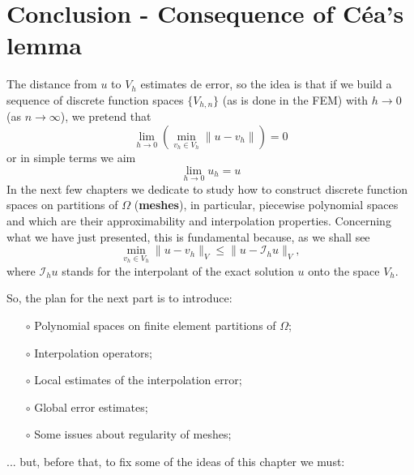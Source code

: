 \section{Conclusion - Consequence of C\'ea's lemma}

The distance from $u$ to $V_h$ estimates de error, so the
idea is that if we build a sequence of discrete function
spaces $\{V_{h,n}\}$ (as is done in the FEM)
with $h\rightarrow 0$ (as $n\rightarrow \infty$),
we pretend that
\begin{equation}
\lim_{h \rightarrow 0} \left ( \min_{v_h \in V_h} \lVert u - v_h \rVert \right ) = 0
\end{equation}
or in simple terms we aim
\begin{equation}
\lim_{h \rightarrow 0} u_h = u
\end{equation}
In the next few chapters we dedicate to study how to construct
discrete function spaces on partitions of $\Omega$ (\textbf{meshes}),
in particular, piecewise polynomial spaces and which are their
approximability and interpolation properties.
Concerning what we have just presented, this is fundamental
because, as we shall see
\begin{equation}
 \min_{v_h \in V_h} \lVert u-v_h \rVert_V \le \lVert u-\mathcal{I}_h{u} \rVert_V ,\nonumber 
\end{equation}
where $\mathcal{I}_h{u}$ stands for the interpolant of the exact
solution $u$ onto the space $V_h$.

So, the plan for the next part is to introduce:

\begin{itemize}
\item[$\circ$] Polynomial spaces on finite element partitions of $\Omega$;
\item[$\circ$] Interpolation operators;
\item[$\circ$] Local estimates of the interpolation error;
\item[$\circ$] Global error estimates;
\item[$\circ$] Some issues about regularity of meshes;
\end{itemize}

\bigskip

... but, before that, to fix some of the ideas of this chapter
we must:

